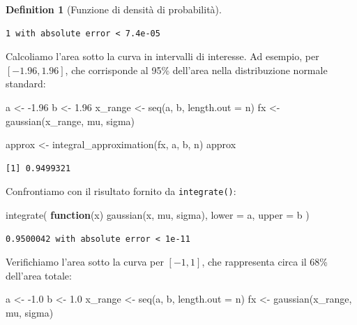 \documentclass[
  letterpaper,
  DIV=11,
  numbers=noendperiod,
  oneside]{scrreprt}
\newenvironment{Shaded}{\begin{snugshade}}{\end{snugshade}}
\newcommand{\AttributeTok}[1]{\textcolor[rgb]{0.40,0.45,0.13}{#1}}
\newcommand{\ControlFlowTok}[1]{\textcolor[rgb]{0.00,0.23,0.31}{\textbf{#1}}}
\newcommand{\FloatTok}[1]{\textcolor[rgb]{0.68,0.00,0.00}{#1}}
\newcommand{\FunctionTok}[1]{\textcolor[rgb]{0.28,0.35,0.67}{#1}}
\newcommand{\NormalTok}[1]{\textcolor[rgb]{0.00,0.23,0.31}{#1}}
\newcommand{\OtherTok}[1]{\textcolor[rgb]{0.00,0.23,0.31}{#1}}
\newcommand{\SpecialCharTok}[1]{\textcolor[rgb]{0.37,0.37,0.37}{#1}}
\theoremstyle{definition}
\theoremstyle{plain}
\theoremstyle{definition}
\newtheorem{definition}{Definition}[chapter]
\theoremstyle{remark}
\begin{document}
\begin{definition}[Funzione di densità di
probabilità]
\begin{verbatim}
1 with absolute error < 7.4e-05
\end{verbatim}

Calcoliamo l'area sotto la curva in intervalli di interesse. Ad esempio,
per \([-1.96, 1.96]\), che corrisponde al 95\% dell'area nella
distribuzione normale standard:

\begin{Shaded}
\begin{Highlighting}[]
\NormalTok{a }\OtherTok{\textless{}{-}} \SpecialCharTok{{-}}\FloatTok{1.96}
\NormalTok{b }\OtherTok{\textless{}{-}} \FloatTok{1.96}
\NormalTok{x\_range }\OtherTok{\textless{}{-}} \FunctionTok{seq}\NormalTok{(a, b, }\AttributeTok{length.out =}\NormalTok{ n)}
\NormalTok{fx }\OtherTok{\textless{}{-}} \FunctionTok{gaussian}\NormalTok{(x\_range, mu, sigma)}

\NormalTok{approx }\OtherTok{\textless{}{-}} \FunctionTok{integral\_approximation}\NormalTok{(fx, a, b, n)}
\NormalTok{approx}
\end{Highlighting}
\end{Shaded}

\begin{verbatim}
[1] 0.9499321
\end{verbatim}

Confrontiamo con il risultato fornito da \texttt{integrate()}:

\begin{Shaded}
\begin{Highlighting}[]
\FunctionTok{integrate}\NormalTok{(}
  \ControlFlowTok{function}\NormalTok{(x) }\FunctionTok{gaussian}\NormalTok{(x, mu, sigma),}
  \AttributeTok{lower =}\NormalTok{ a,}
  \AttributeTok{upper =}\NormalTok{ b}
\NormalTok{)}
\end{Highlighting}
\end{Shaded}

\begin{verbatim}
0.9500042 with absolute error < 1e-11
\end{verbatim}

Verifichiamo l'area sotto la curva per \([-1, 1]\), che rappresenta
circa il 68\% dell'area totale:

\begin{Shaded}
\begin{Highlighting}[]
\NormalTok{a }\OtherTok{\textless{}{-}} \SpecialCharTok{{-}}\FloatTok{1.0}
\NormalTok{b }\OtherTok{\textless{}{-}} \FloatTok{1.0}
\NormalTok{x\_range }\OtherTok{\textless{}{-}} \FunctionTok{seq}\NormalTok{(a, b, }\AttributeTok{length.out =}\NormalTok{ n)}
\NormalTok{fx }\OtherTok{\textless{}{-}} \FunctionTok{gaussian}\NormalTok{(x\_range, mu, sigma)}


\end{Highlighting}
\end{Shaded}
\end{definition}
\end{document}
